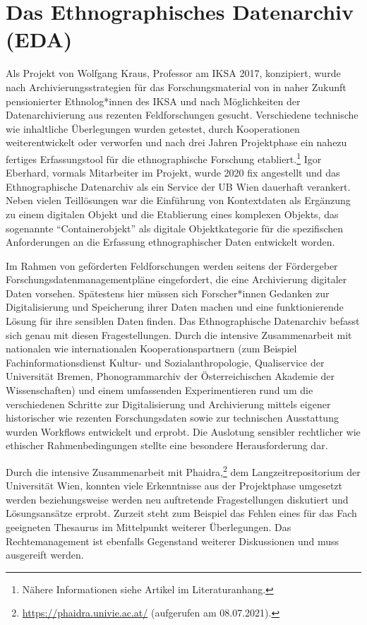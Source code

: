 \documentclass[a4paper,
fontsize=11pt,
oneside,
numbers=noperiodatend,
parskip=half-,
bibliography=totoc,
final
]{scrartcl}
\begin{document}
\hypertarget{das-ethnographisches-datenarchiv-eda}{%
\section{Das Ethnographisches Datenarchiv
(EDA)}\label{das-ethnographisches-datenarchiv-eda}}

Als Projekt von Wolfgang Kraus, Professor am IKSA 2017, konzipiert,
wurde nach Archivierungsstrategien für das Forschungsmaterial von in
naher Zukunft pensionierter Ethnolog*innen des IKSA und nach
Möglichkeiten der Datenarchivierung aus rezenten Feldforschungen
gesucht. Verschiedene technische wie inhaltliche Überlegungen wurden
getestet, durch Kooperationen weiterentwickelt oder verworfen und nach
drei Jahren Projektphase ein nahezu fertiges Erfassungstool für die
ethnographische Forschung etabliert.\footnote{Nähere Informationen siehe
  Artikel im Literaturanhang.} Igor Eberhard, vormals Mitarbeiter im
Projekt, wurde 2020 fix angestellt und das Ethnographische Datenarchiv
als ein Service der UB Wien dauerhaft verankert. Neben vielen
Teillösungen war die Einführung von Kontextdaten als Ergänzung zu einem
digitalen Objekt und die Etablierung eines komplexen Objekts, das
sogenannte \enquote{Containerobjekt} als digitale Objektkategorie für
die spezifischen Anforderungen an die Erfassung ethnographischer Daten
entwickelt worden.

Im Rahmen von geförderten Feldforschungen werden seitens der Fördergeber
Forschungsdatenmanagementpläne eingefordert, die eine Archivierung
digitaler Daten vorsehen. Spätestens hier müssen sich Forscher*innen
Gedanken zur Digitalisierung und Speicherung ihrer Daten machen und eine
funktionierende Lösung für ihre sensiblen Daten finden. Das
Ethnographische Datenarchiv befasst sich genau mit diesen
Fragestellungen. Durch die intensive Zusammenarbeit mit nationalen wie
internationalen Kooperationspartnern (zum Beispiel
Fachinformationsdienst Kultur- und Sozialanthropologie, Qualiservice der
Universität Bremen, Phonogrammarchiv der Österreichischen Akademie der
Wissenschaften) und einem umfassenden Experimentieren rund um die
verschiedenen Schritte zur Digitalisierung und Archivierung mittels
eigener historischer wie rezenten Forschungsdaten sowie zur technischen
Ausstattung wurden Workflows entwickelt und erprobt. Die Auslotung
sensibler rechtlicher wie ethischer Rahmenbedingungen stellte eine
besondere Herausforderung dar.

Durch die intensive Zusammenarbeit mit Phaidra,\footnote{\url{https://phaidra.univie.ac.at/}
  (aufgerufen am 08.07.2021).} dem Langzeitrepositorium der Universität
Wien, konnten viele Erkenntnisse aus der Projektphase umgesetzt werden
beziehungsweise werden neu auftretende Fragestellungen diskutiert und
Lösungsansätze erprobt. Zurzeit steht zum Beispiel das Fehlen eines für
das Fach geeigneten Thesaurus im Mittelpunkt weiterer Überlegungen. Das
Rechtemanagement ist ebenfalls Gegenstand weiterer Diskussionen und muss
ausgereift werden.
\end{document}
